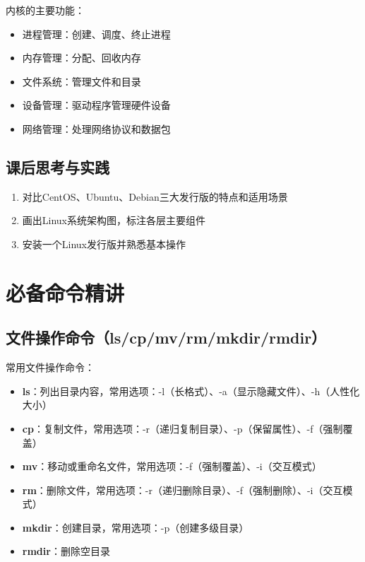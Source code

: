 \documentclass[12pt,UTF8]{ctexbook}
\begin{document}
内核的主要功能：
\begin{itemize}
    \item 进程管理：创建、调度、终止进程
    \item 内存管理：分配、回收内存
    \item 文件系统：管理文件和目录
    \item 设备管理：驱动程序管理硬件设备
    \item 网络管理：处理网络协议和数据包
\end{itemize}

\section{课后思考与实践}
\label{sec:overview-practice}
\begin{enumerate}
    \item 对比CentOS、Ubuntu、Debian三大发行版的特点和适用场景
    \item 画出Linux系统架构图，标注各层主要组件
    \item 安装一个Linux发行版并熟悉基本操作
\end{enumerate}

\chapter{必备命令精讲}
\label{chap:essential-commands}

\section{文件操作命令（ls/cp/mv/rm/mkdir/rmdir）}
\label{sec:file-cmds}

常用文件操作命令：

\begin{itemize}
    \item \textbf{ls}：列出目录内容，常用选项：-l（长格式）、-a（显示隐藏文件）、-h（人性化大小）
    \item \textbf{cp}：复制文件，常用选项：-r（递归复制目录）、-p（保留属性）、-f（强制覆盖）
    \item \textbf{mv}：移动或重命名文件，常用选项：-f（强制覆盖）、-i（交互模式）
    \item \textbf{rm}：删除文件，常用选项：-r（递归删除目录）、-f（强制删除）、-i（交互模式）
    \item \textbf{mkdir}：创建目录，常用选项：-p（创建多级目录）
    \item \textbf{rmdir}：删除空目录
\end{itemize}
\end{document}
